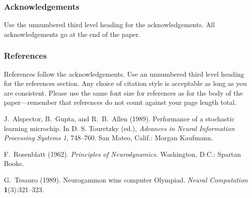 \documentclass[twoside]{article}
\begin{document}
\subsubsection*{Acknowledgements}

Use the unnumbered third level heading for the acknowledgements.  All
acknowledgements go at the end of the paper.

\subsubsection*{References}

References follow the acknowledgements.  Use an unnumbered third level
heading for the references section.  Any choice of citation style is
acceptable as long as you are consistent.  Please use the same font
size for references as for the body of the paper---remember that
references do not count against your page length total.

\begin{thebibliography}{}
\setlength{\itemindent}{-\leftmargin}
\makeatletter\renewcommand{\@biblabel}[1]{}\makeatother
\bibitem{} J.~Alspector, B.~Gupta, and R.~B.~Allen (1989).
    \newblock Performance of a stochastic learning microchip.
    \newblock In D. S. Touretzky (ed.),
    \textit{Advances in Neural Information Processing Systems 1}, 748--760.
    San Mateo, Calif.: Morgan Kaufmann.

\bibitem{} F.~Rosenblatt (1962).
    \newblock \textit{Principles of Neurodynamics.}
    \newblock Washington, D.C.: Spartan Books.

\bibitem{} G.~Tesauro (1989).
    \newblock Neurogammon wins computer Olympiad.
    \newblock \textit{Neural Computation} \textbf{1}(3):321--323.
\end{thebibliography}
\end{document}
